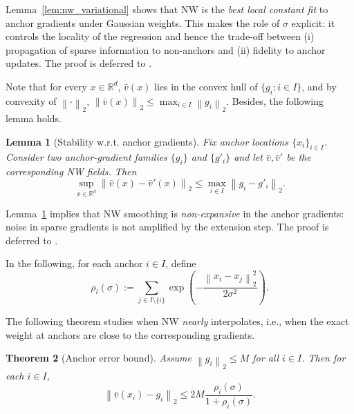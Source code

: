\documentclass{article} %
\newcommand{\R}{\mathbb{R}}
\newcommand*{\norm}[1]{\left\|#1\right\|}
\theoremstyle{plain}
\newtheorem{theorem}{Theorem}[section]
\newtheorem{lemma}[theorem]{Lemma}
\newtheorem{corollary}[theorem]{Corollary}
\theoremstyle{definition}
\theoremstyle{remark}
\begin{document}
Lemma~\ref{lem:nw_variational} shows that NW is the \emph{best local constant fit} to anchor gradients under Gaussian weights. This makes the role of $\sigma$ explicit: it controls the locality of the regression and hence the trade-off between (i) propagation of sparse information to non-anchors and (ii) fidelity to anchor updates. The proof is deferred to .

Note that for every $x \in \R^d$, $\bar v(x)$ lies in the convex hull of $\{g_i : i \in I\}$, and by convexity of $\norm{\cdot}_2$, $\norm{ \bar v(x)}_2 \leq \max_{i \in I} \norm{g_i}_2$. Besides, the following lemma holds.

\begin{lemma}[Stability w.r.t. anchor gradients]
\label{lem:stable_gradients}
Fix anchor locations $\{ x_i \}_{i \in I}$. Consider two anchor-gradient families $\{g_i\}$ and $\{g'_i\}$ and let $\bar v, \bar v'$ be the corresponding NW fields. Then
    \[
        \sup_{x \in \R^d} \norm{\bar v(x) - \bar v'(x)}_2 \le \max_{i \in I} \norm{g_i - g'_i}_2.
    \]
\end{lemma}


Lemma~\ref{lem:stable_gradients} implies that NW smoothing is \emph{non-expansive} in the anchor gradients: noise in sparse gradients is not amplified by the extension step. The proof is deferred to .


In the following, for each anchor $i \in I$, define
    \[ \rho_i(\sigma) := \sum_{j \in I \setminus \{i\}} \exp \left( - \frac{\norm{x_i - x_j}_2^2}{2\sigma^2} \right). \]



The following theorem studies when NW \emph{nearly} interpolates, i.e., when the exact weight at anchors are close to the corresponding gradients.
\begin{theorem}[Anchor error bound]
\label{thm:anchor_error}
    Assume $\norm{g_i}_2\le M$ for all $i \in I$. Then for each $i \in I$,
\begin{equation}
\label{eq:anchor_error}
    \norm{\bar v(x_i) - g_i}_2 \le 2 M \frac{\rho_i(\sigma)}{1 + \rho_i(\sigma)}.
\end{equation}
\end{theorem}

\end{document}
